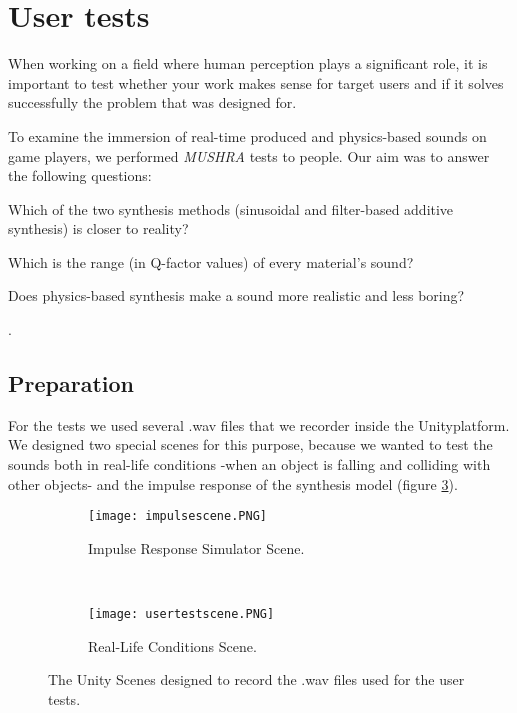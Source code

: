 \section{User tests}\label{sec:tests}
When working on a field where human perception plays a significant role, it is important to test whether your work makes sense for target users and if it solves successfully the problem that was designed for.

To examine the immersion of real-time produced and physics-based sounds on game players, we performed \textit{MUSHRA}\cite{series2014method} tests to people. Our aim was to answer the following questions: \begin{inparaenum}[1)]
\item Which of the two synthesis methods (sinusoidal and filter-based additive synthesis) is closer to reality? 
\item Which is the range (in Q-factor values) of every material's sound?
\item Does physics-based synthesis make a sound more realistic and less boring?
\end{inparaenum}.

\subsection{Preparation}
For the tests we used several .wav files that we recorder inside the Unity\textregistered platform. We designed two special scenes for this purpose, because we wanted to test the sounds both in real-life conditions -when an object is falling and colliding with other objects- and the impulse response of the synthesis model (figure \ref{fig:test_scenes}). 

\begin{figure}[H]
    \centering
    \begin{subfigure}[b]{0.45\textwidth}
        \texttt{[image: impulsescene.PNG]}
        \caption{Impulse Response Simulator Scene.}
        \label{fig:test_sc1}
    \end{subfigure}
    ~ %
    \begin{subfigure}[b]{0.45\textwidth}
        \texttt{[image: usertestscene.PNG]}
        \caption{Real-Life Conditions Scene.}
        \label{fig:test_sc2}
    \end{subfigure}
    \caption{The Unity Scenes designed to record the .wav files used for the user tests.}\label{fig:test_scenes}
\end{figure}

